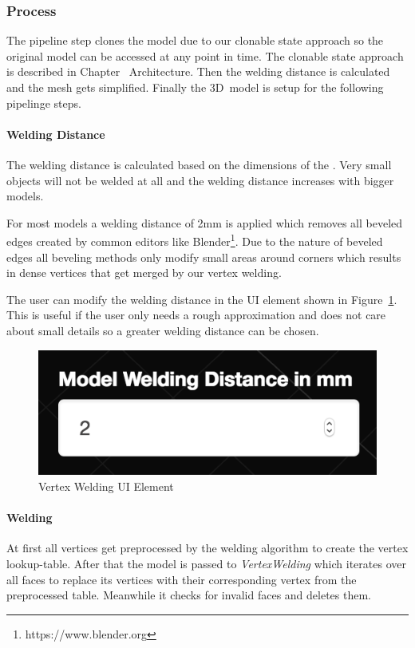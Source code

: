\documentclass[../ClassicThesis.tex]{subfiles}
\begin{document}
\subsubsection{Process}

The pipeline step clones the model due to our clonable state approach so the original model can be accessed at any point in time. The clonable state approach is described in Chapter~ Architecture. Then the welding distance is calculated and the mesh gets simplified. Finally the 3D~model is setup for the following pipelinge steps.


\paragraph{Welding Distance}

The welding distance is calculated based on the dimensions of the {\threedmodel}. Very small objects will not be welded at all and the welding distance increases with bigger models.

For most models a welding distance of 2mm is applied which removes all beveled edges created by common editors like Blender\footnote{https://www.blender.org}. Due to the nature of beveled edges all beveling methods only modify small areas around corners which results in dense vertices that get merged by our vertex welding.

The user can modify the welding distance in the UI element shown in Figure~\ref{fig:weldingUI}. This is useful if the user only needs a rough approximation and does not care about small details so a greater welding distance can be chosen.

\begin{figure}
\includegraphics[width=0.5\columnwidth]{Images/04-approx-weldingUI.png}
\caption{Vertex Welding UI Element}
\label{fig:weldingUI}
\end{figure}



\paragraph{Welding}

At first all vertices get preprocessed by the welding algorithm to create the vertex lookup-table. After that the model is passed to \emph{VertexWelding} which iterates over all faces to replace its vertices with their corresponding vertex from the preprocessed table. Meanwhile it checks for invalid faces and deletes them.
\end{document}
